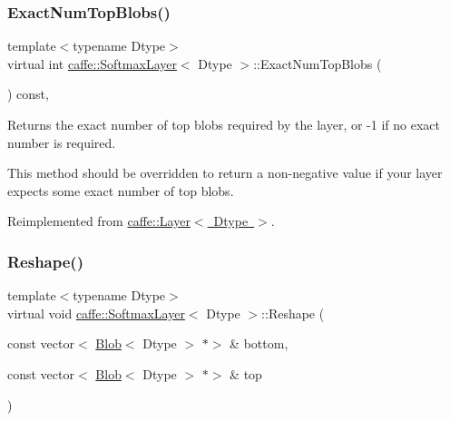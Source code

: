 \subsubsection{\texorpdfstring{Exact\+Num\+Top\+Blobs()}{ExactNumTopBlobs()}\hspace{0.1cm}{\footnotesize\ttfamily [2/2]}}
{\footnotesize\ttfamily template$<$typename Dtype$>$ \\
virtual int \mbox{\hyperlink{classcaffe_1_1_softmax_layer}{caffe\+::\+Softmax\+Layer}}$<$ Dtype $>$\+::Exact\+Num\+Top\+Blobs (\begin{DoxyParamCaption}{ }\end{DoxyParamCaption}) const\hspace{0.3cm}{\ttfamily [inline]}, {\ttfamily [virtual]}}



Returns the exact number of top blobs required by the layer, or -\/1 if no exact number is required. 

This method should be overridden to return a non-\/negative value if your layer expects some exact number of top blobs. 

Reimplemented from \mbox{\hyperlink{classcaffe_1_1_layer_a64e2ca72c719e4b2f1f9216ccfb0d37f}{caffe\+::\+Layer$<$ Dtype $>$}}.

\mbox{\label{classcaffe_1_1_softmax_layer_a503694b3161839de7c19d7d0af2cecc2}} 
\subsubsection{\texorpdfstring{Reshape()}{Reshape()}\hspace{0.1cm}{\footnotesize\ttfamily [1/2]}}
{\footnotesize\ttfamily template$<$typename Dtype$>$ \\
virtual void \mbox{\hyperlink{classcaffe_1_1_softmax_layer}{caffe\+::\+Softmax\+Layer}}$<$ Dtype $>$\+::Reshape (\begin{DoxyParamCaption}\item[{const vector$<$ \mbox{\hyperlink{classcaffe_1_1_blob}{Blob}}$<$ Dtype $>$ $\ast$$>$ \&}]{bottom,  }\item[{const vector$<$ \mbox{\hyperlink{classcaffe_1_1_blob}{Blob}}$<$ Dtype $>$ $\ast$$>$ \&}]{top }\end{DoxyParamCaption})\hspace{0.3cm}{\ttfamily [virtual]}}



